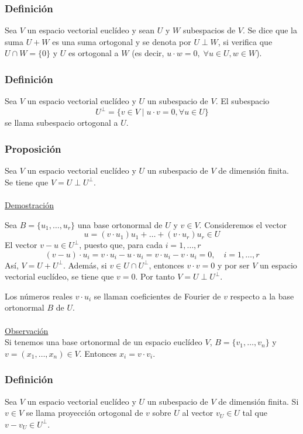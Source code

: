 \documentclass[12pt, a4paper, ones, notitlepage, openany,titlepage]{article}
\begin{document}
\subsubsection{Definición}
Sea $V$ un espacio vectorial euclídeo y sean $U$ y $W$ subespacios de $V$. Se dice que la suma $U+W$ es una suma ortogonal y se denota por $U \perp W$, si verifica que $U \cap W=\{0\}$ y $U$ es ortogonal a $W$ (es decir, $u \cdot w = 0, \; \forall u \in U, w\in W$).

\subsubsection{Definición}
Sea $V$ un espacio vectorial euclídeo y $U$ un subespacio de $V$. El subespacio
$$
U^{\perp}=\{v \in V \mid u \cdot v=0, \forall u \in U\}
$$
se llama subespacio ortogonal a $U$.

\subsubsection{Proposición}
Sea $V$ un espacio vectorial euclídeo y $U$ un subespacio de $V$ de dimensión finita. Se tiene que $V=U \perp U^{\perp}$.\\\\
\underline{Demostración}

Sea $B=\{u_{1}, \ldots, u_{r}\}$ una base ortonormal de $U$ y $v \in V$. Consideremos el vector
$$
u=\left(v \cdot u_{1}\right) u_{1}+\ldots+\left(v \cdot u_{r}\right) u_{r} \in U
$$
El vector $v-u \in U^{\perp}$, puesto que, para cada $i=1, \ldots, r$
$$
(v-u) \cdot u_{i}=v \cdot u_{i}-u \cdot u_{i}=v \cdot u_{i}-v \cdot u_{i}=0, \quad i=1, \ldots, r
$$
Así, $V=U+U^{\perp}$. Además, si $v \in U \cap U^{\perp}$, entonces $v \cdot v=0$ y por ser $V$ un espacio vectorial euclídeo, se tiene que $v=0$. Por tanto $V=U \perp U^{\perp}$.

Los números reales $v \cdot u_{i}$ se llaman coeficientes de Fourier de $v$ respecto a la base ortonormal $B$ de $U$.\\\\
\underline{Observación}\\
Si tenemos una base ortonormal de un espacio euclídeo $V$, $B = \{v_1,\ldots,v_n\}$ y $v = (x_1,\ldots,x_n)\in V$. Entonces $x_i = v \cdot v_i$.

\subsubsection{Definición} Sea $V$ un espacio vectorial euclídeo y $U$ un subespacio de $V$ de dimensión finita. Si $v \in V$ se llama proyección ortogonal de $v$ sobre $U$ al vector $v_{U} \in U$ tal que $v-v_{U} \in U^{\perp}$.
\end{document}
